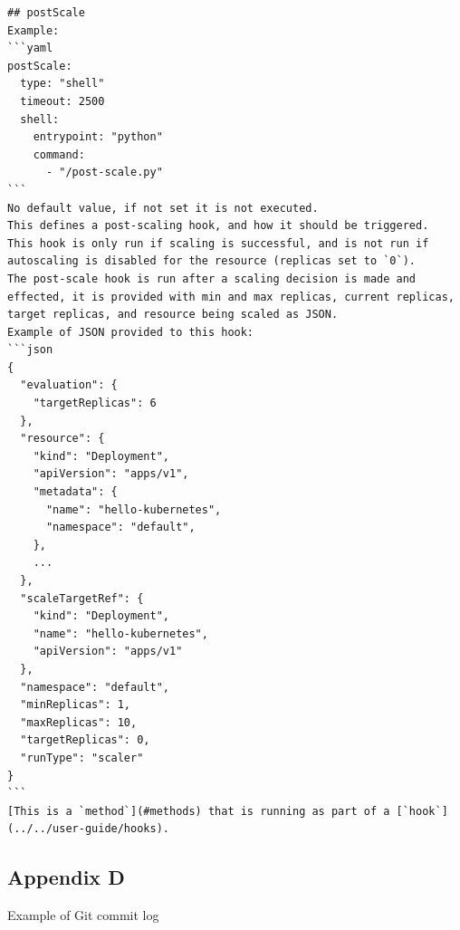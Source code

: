 \begin{lstlisting}
## postScale
Example:
```yaml
postScale: 
  type: "shell"
  timeout: 2500
  shell: 
    entrypoint: "python"
    command: 
      - "/post-scale.py"
```
No default value, if not set it is not executed.  
This defines a post-scaling hook, and how it should be triggered.  
This hook is only run if scaling is successful, and is not run if autoscaling is disabled for the resource (replicas set to `0`).
The post-scale hook is run after a scaling decision is made and effected, it is provided with min and max replicas, current replicas, target replicas, and resource being scaled as JSON.  
Example of JSON provided to this hook:
```json
{
  "evaluation": {
    "targetReplicas": 6
  },
  "resource": {
    "kind": "Deployment",
    "apiVersion": "apps/v1",
    "metadata": {
      "name": "hello-kubernetes",
      "namespace": "default",
    },
    ...
  },
  "scaleTargetRef": {
    "kind": "Deployment",
    "name": "hello-kubernetes",
    "apiVersion": "apps/v1"
  },
  "namespace": "default",
  "minReplicas": 1,
  "maxReplicas": 10,
  "targetReplicas": 0,
  "runType": "scaler"
}
```
[This is a `method`](#methods) that is running as part of a [`hook`](../../user-guide/hooks).
\end{lstlisting}
\newpage

\subsection*{Appendix D}

Example of Git commit log

